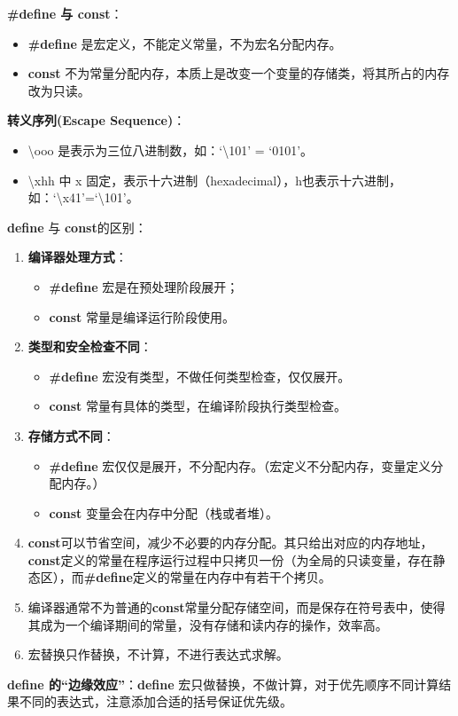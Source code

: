\documentclass[UTF8]{ctexart}
\begin{document}
	\begin{framed}
		\textbf{\#define 与 const}：
		\begin{itemize}
			\item \textbf{\#define} 是宏定义，不能定义常量，不为宏名分配内存。
			\item \textbf{const} 不为常量分配内存，本质上是改变一个变量的存储类，将其所占的内存改为只读。
		\end{itemize}
		\textbf{转义序列(Escape Sequence)}：
		\begin{itemize}
			\item \textbackslash ooo 是表示为三位八进制数，如：‘\textbackslash 101’ = ‘0101’。
			\item \textbackslash xhh 中 x 固定，表示十六进制（hexadecimal），h也表示十六进制，如：‘\textbackslash x41’=‘\textbackslash 101’。
		\end{itemize}
		\textbf{define} 与 \textbf{const}的区别：
		\begin{enumerate}
			\item \textbf{编译器处理方式}：\begin{itemize}
				\item \textbf{\#define} 宏是在预处理阶段展开；
				\item \textbf{const} 常量是编译运行阶段使用。
			\end{itemize}
			\item \textbf{类型和安全检查不同}：\begin{itemize}
				\item \textbf{\#define} 宏没有类型，不做任何类型检查，仅仅展开。
				\item \textbf{const} 常量有具体的类型，在编译阶段执行类型检查。
			\end{itemize}
			\item \textbf{存储方式不同}：\begin{itemize}
				\item \textbf{\#define} 宏仅仅是展开，不分配内存。（宏定义不分配内存，变量定义分配内存。）
				\item \textbf{const} 变量会在内存中分配（栈或者堆）。
			\end{itemize}
			\item \textbf{const}可以节省空间，减少不必要的内存分配。其只给出对应的内存地址，\textbf{const}定义的常量在程序运行过程中只拷贝一份（为全局的只读变量，存在静态区），而\textbf{\#define}定义的常量在内存中有若干个拷贝。
			\item 编译器通常不为普通的\textbf{const}常量分配存储空间，而是保存在符号表中，使得其成为一个编译期间的常量，没有存储和读内存的操作，效率高。
			\item 宏替换只作替换，不计算，不进行表达式求解。
		\end{enumerate}
		\textbf{define 的“边缘效应”}：\textbf{define} 宏只做替换，不做计算，对于优先顺序不同计算结果不同的表达式，注意添加合适的括号保证优先级。


\end{framed}
\end{document}
